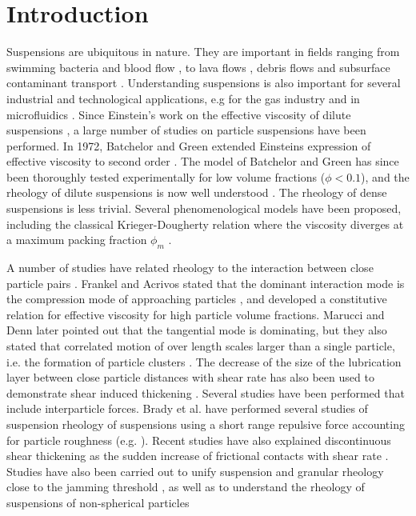 \documentclass[aps,pre,twocolumn,letterpaper,floatfix,showpacs]{revtex4}
\begin{document}
\section{Introduction}
Suspensions are ubiquitous in nature. They are important in fields ranging from swimming bacteria \cite{lushi2014fluid} and blood flow \cite{freund2014numerical}, to lava flows \cite{yamato2012numerical,glazner2014magmatic}, debris flows \cite{coussot1996recognition} and subsurface contaminant transport \cite{mccarthy1989subsurface}. Understanding suspensions is also important for several industrial and technological applications, e.g for the gas industry \cite{meakin2013shale,patankar2002power,kuzkin2014computer} and in microfluidics \cite{whitesides2006origins,xuan2010particle}. Since Einstein's work on the effective viscosity of dilute suspensions \cite{einstein1906eineneue,einstein1911berichtigung}, a large number of studies on particle suspensions have been performed.  In 1972, Batchelor and Green extended Einsteins expression of effective viscosity to second order \cite{batchelor1972determination}.  The model of Batchelor and Green has since been thoroughly tested experimentally for low volume fractions ($\phi<0.1$), and the rheology of dilute suspensions is now well understood \cite{ovarlez2006local}. The rheology of dense suspensions is less trivial. Several phenomenological models have been proposed, including the classical Krieger-Dougherty relation where the viscosity diverges at a maximum packing fraction $\phi_m$ \cite{krieger1959mechanism}. 

A number of studies have related rheology to the interaction between close particle pairs \cite{batchelor1972determination,frankel1967viscosity,marrucci1985viscosity,iskakova2013shear,sierou2002rheology,brady1997microstructure,mills2009apparent}. Frankel and Acrivos stated that the dominant interaction mode is the compression mode of approaching particles \cite{frankel1967viscosity}, and developed a constitutive relation for effective viscosity for high particle volume fractions.  
Marucci and Denn later pointed out that the tangential mode is dominating, but they also stated that correlated motion of over length scales larger than a single particle, i.e. the formation of particle clusters \cite{marrucci1985viscosity}. The decrease of the size of the lubrication layer between close particle distances with shear rate has also been used to demonstrate shear induced thickening \cite{iskakova2013shear}.
Several studies have been performed that include interparticle forces. Brady et al. have performed several studies of suspension rheology of suspensions using a short range repulsive force accounting for particle roughness (e.g. \cite{brady1997microstructure,sierou2002rheology}). Recent studies have also explained discontinuous shear thickening as the sudden increase of frictional contacts with shear rate \cite{seto2013discontinuous}.  Studies have also been carried out to unify suspension and granular rheology close to the jamming threshold \cite{boyer2011unifying}, as well as to understand the rheology of suspensions of non-spherical particles \cite{mueller2009rheology}
\end{document}
